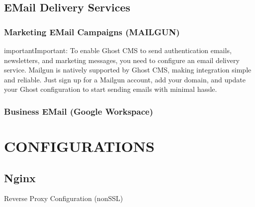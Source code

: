 \documentclass[letterpaper,10pt,english]{sphinxmanual}
\begin{document}
\section{E\sphinxhyphen{}Mail Delivery Services}
\label{\detokenize{setup_frontend:e-mail-delivery-services}}

\subsection{Marketing E\sphinxhyphen{}Mail Campaigns (MAILGUN)}
\label{\detokenize{setup_frontend:marketing-e-mail-campaigns-mailgun}}
\begin{sphinxadmonition}{important}{Important:}
\sphinxAtStartPar
To enable Ghost CMS to send authentication emails, newsletters, and marketing messages, you need to configure an email delivery service. Mailgun is natively supported by Ghost CMS, making integration simple and reliable. Just sign up for a Mailgun account, add your domain, and update your Ghost configuration to start sending emails with minimal hassle.
\end{sphinxadmonition}


\subsection{Business E\sphinxhyphen{}Mail (Google Workspace)}
\label{\detokenize{setup_frontend:business-e-mail-google-workspace}}
\sphinxstepscope


\chapter{CONFIGURATIONS}
\label{\detokenize{configurations:configurations}}\label{\detokenize{configurations::doc}}

\section{Nginx}
\label{\detokenize{configurations:nginx}}
\sphinxAtStartPar
Reverse Proxy Configuration (non\sphinxhyphen{}SSL)
\end{document}
